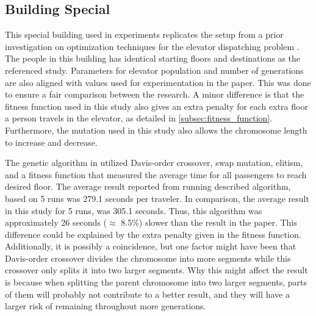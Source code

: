 \newpage

\subsection{Building Special}
This special building used in experiments replicates the setup from a prior investigation on optimization techniques for the elevator dispatching problem \cite{ahmed2022investigation}. The people in this building has identical starting floors and destinations as the referenced study. Parameters for elevator population and number of generations are also aligned with values used for experimentation in the paper. This was done to ensure a fair comparison between the research. A minor difference is that the fitness function used in this study also gives an extra penalty for each extra floor a person travels in the elevator, as detailed in \ref{subsec:fitness_function}. Furthermore, the mutation used in this study also allows the chromosome length to increase and decrease.

The genetic algorithm in \cite{ahmed2022investigation} utilized Davis-order crossover, swap mutation, elitism, and a fitness function that measured the average time for all passengers to reach desired floor. The average result reported from running described algorithm, based on 5 runs was 279.1 seconds per traveler. In comparison, the average result in this study for 5 runs, was 305.1 seconds. Thus, this algorithm was approximately 26 seconds ($\approx$ 8.5\%) slower than the result in the paper. This difference could be explained by the extra penalty given in the fitness function. Additionally, it is possibly a coincidence, but one factor might have been that Davis-order crossover divides the chromosome into more segments while this crossover only splits it into two larger segments. Why this might affect the result is because when splitting the parent chromosome into two larger segments, parts of them will probably not contribute to a better result, and they will have a larger risk of remaining throughout more generations.
